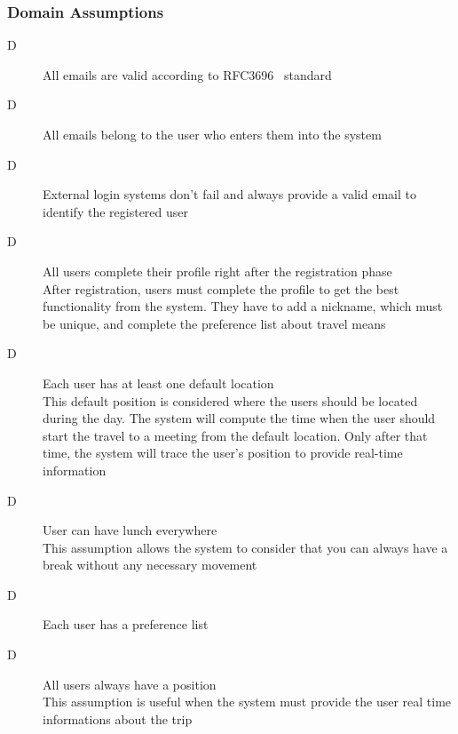 \subsubsection{Domain Assumptions}

\begin{description}

\item[D\thecountDom] All emails are valid according to RFC3696~\cite{RFC3696} standard
\item[D\thecountDom] All emails belong to the user who enters them into the system

\item[D\thecountDom] External login systems don’t fail and always provide a valid email to identify the registered user

\item[D\thecountDom] All users complete their profile right after the registration phase \\ [0.1cm]
After registration, users must complete the profile to get the best functionality from the system. They have to add a nickname, which must be unique, and complete the preference list about travel means

\item[D\thecountDom] Each user has at least one default location \\ [0.1cm]
This default position is considered where the users should be located during the day. The system will compute the time when the user should start the travel to a meeting from the default location. Only after that time, the system will trace the user's position to provide real-time information

\item[D\thecountDom]  User can have lunch everywhere \\ [0.1cm]
This assumption allows the system to consider that you can always have a break without any necessary movement

\item[D\thecountDom]  Each user has a preference list

\item[D\thecountDom]  All users always have a position \\ [0.1cm]
This assumption is useful when the system must provide the user real time informations about the trip


\end{description}
